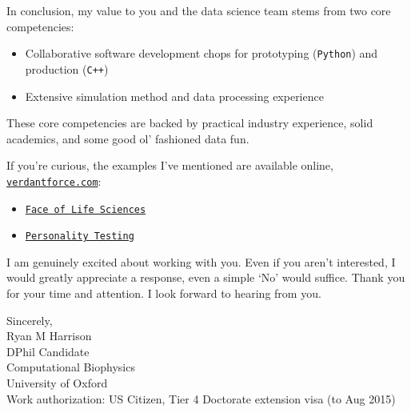 \documentclass{../res}
\begin{document}
\begin{sloppypar}
\begin{resume}
In conclusion, my value to you and the data science team stems from two core competencies: 
\begin{itemize}[itemindent=1cm]
    \item Collaborative software development chops for prototyping (\texttt{Python}) and production (\texttt{C++})
    \item Extensive simulation method and data processing experience
\end{itemize}
These core competencies are backed by practical industry experience, solid academics, and some good ol' fashioned data fun.

If you're curious, the examples I've mentioned are available online, \href{http://www.verdantforce.com}{\nolinkurl{verdantforce.com}}:
\begin{itemize}[itemindent=1cm]
    \item \href{http://www.verdantforce.com/2012/05/infographic-face-of-life-science}{\nolinkurl{Face of Life Sciences}}
    \item \href{http://www.verdantforce.com/2014/04/data-science-personality-testing}{\nolinkurl{Personality Testing}}
\end{itemize}

I am genuinely excited about working with you. Even if you aren't interested, I would greatly appreciate a response, even a simple `No' would suffice. Thank you for your time and attention. I look forward to hearing from you.

Sincerely, \\
Ryan M Harrison \\ 
DPhil Candidate \\
Computational Biophysics \\
University of Oxford  \\
Work authorization: US Citizen, Tier 4 Doctorate extension visa (to Aug 2015)
\end{resume} 
\end{sloppypar}
\end{document}
